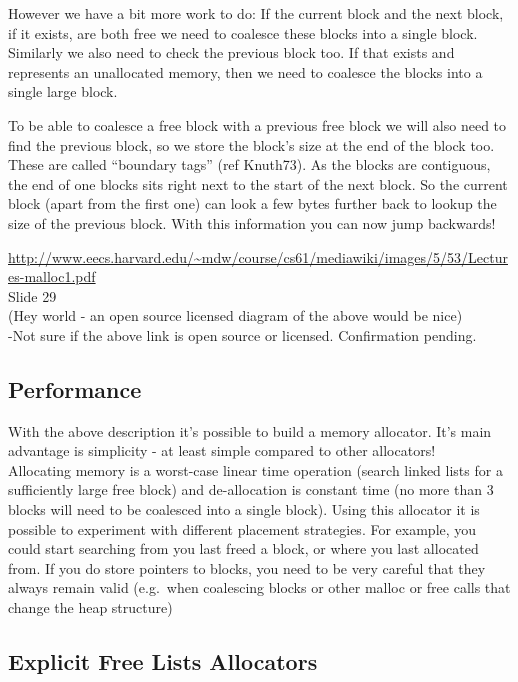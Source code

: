 However we have a bit more work to do: If the current block and the next
block, if it exists, are both free we need to coalesce these blocks into
a single block.\\Similarly we also need to check the previous block too.
If that exists and represents an unallocated memory, then we need to
coalesce the blocks into a single large block.

To be able to coalesce a free block with a previous free block we will
also need to find the previous block, so we store the block's size at
the end of the block too. These are called ``boundary tags'' (ref
Knuth73). As the blocks are contiguous, the end of one blocks sits right
next to the start of the next block. So the current block (apart from
the first one) can look a few bytes further back to lookup the size of
the previous block. With this information you can now jump backwards!

\url{http://www.eecs.harvard.edu/~mdw/course/cs61/mediawiki/images/5/53/Lectures-malloc1.pdf}\\Slide
29\\(Hey world - an open source licensed diagram of the above would be
nice)\\-Not sure if the above link is open source or licensed.
Confirmation pending.

\subsection{Performance}\label{performance}

With the above description it's possible to build a memory allocator.
It's main advantage is simplicity - at least simple compared to other
allocators!\\Allocating memory is a worst-case linear time operation
(search linked lists for a sufficiently large free block) and
de-allocation is constant time (no more than 3 blocks will need to be
coalesced into a single block). Using this allocator it is possible to
experiment with different placement strategies. For example, you could
start searching from you last freed a block, or where you last allocated
from. If you do store pointers to blocks, you need to be very careful
that they always remain valid (e.g.~when coalescing blocks or other
malloc or free calls that change the heap structure)

\subsection{Explicit Free Lists
Allocators}\label{explicit-free-lists-allocators}


